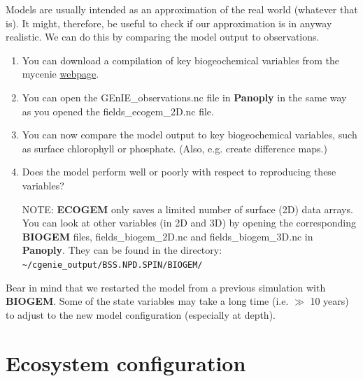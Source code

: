 \documentclass[11pt,fleqn]{book} %
\begin{document}
Models are usually intended as an approximation of the real world (whatever that is). It might, therefore, be useful to check if our approximation is in anyway realistic. We can do this by comparing the model output to observations.

\vspace{2mm}
\begin{enumerate}[noitemsep]

\item You can download a compilation of key biogeochemical variables from the \textsf{\small mycenie} \href{http://www.seao2.info/cgenie/data/GEnIE_observations.nc}{webpage}.

\item You can open the \textsf{\small GEnIE\_observations.nc} file in \textbf{Panoply} in the same way as you opened the \textsf{\small fields\_ecogem\_2D.nc} file.

\item You can now compare the model output to key biogeochemical variables, such as surface chlorophyll or phosphate. (Also, e.g. create difference maps.)

\item Does the model perform well or poorly with respect to reproducing these variables?

\item[NOTE:] \textbf{ECOGEM} only saves a limited number of surface (2D) data arrays. You can look at other variables (in 2D and 3D) by opening the corresponding \textbf{BIOGEM} files, \textsf{\small fields\_biogem\_2D.nc} and \textsf{\small fields\_biogem\_3D.nc} in \textbf{Panoply}. They can be found in the directory:
\\ \texttt{\textasciitilde{}/cgenie\_output/BSS.NPD.SPIN/BIOGEM/}

\end{enumerate}
\vspace{2mm}

\noindent Bear in mind that we restarted the model from a previous simulation with \textbf{BIOGEM}. Some of the state variables may take a long time (i.e. $\gg$ 10 years) to adjust to the new model configuration (especially at depth). 

\newpage


\section{Ecosystem configuration}
\end{document}
